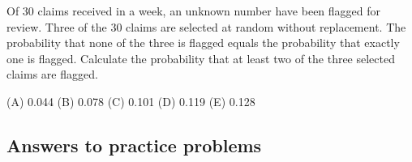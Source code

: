 \begin{practice}
Of $30$ claims received in a week, an unknown number have been flagged for review. Three of
the $30$ claims are selected at random without replacement. The probability that none of the
three is flagged equals the probability that exactly one is flagged. Calculate the
probability that at least two of the three selected claims are flagged.
\par\smallskip\noindent (A) 0.044 \quad (B) 0.078 \quad (C) 0.101 \quad (D) 0.119 \quad (E) 0.128
\end{practice}

\subsection{Answers to practice problems}


